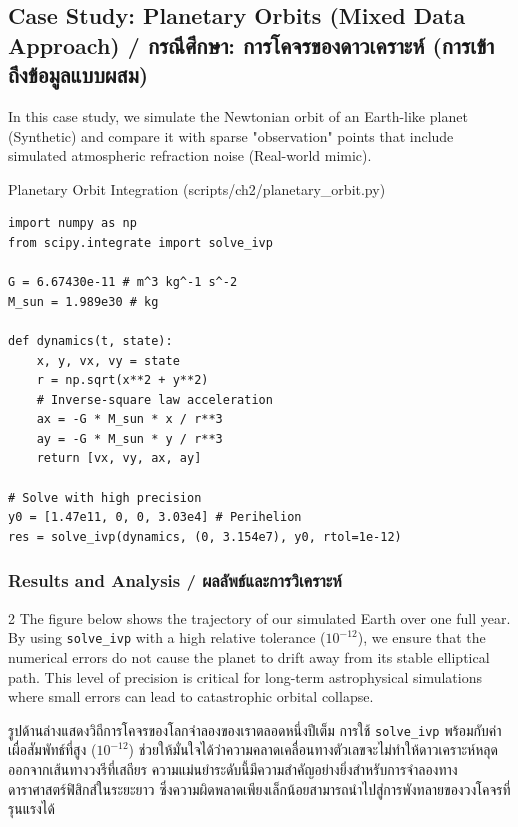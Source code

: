 \subsection{Case Study: Planetary Orbits (Mixed Data Approach) \quad / \quad \textthai{กรณีศึกษา: การโคจรของดาวเคราะห์ (การเข้าถึงข้อมูลแบบผสม)}}
In this case study, we simulate the Newtonian orbit of an Earth-like planet (Synthetic) and compare it with sparse "observation" points that include simulated atmospheric refraction noise (Real-world mimic).

\begin{pythonbox}{Planetary Orbit Integration (scripts/ch2/planetary\_orbit.py)}
\begin{lstlisting}
import numpy as np
from scipy.integrate import solve_ivp

G = 6.67430e-11 # m^3 kg^-1 s^-2
M_sun = 1.989e30 # kg

def dynamics(t, state):
    x, y, vx, vy = state
    r = np.sqrt(x**2 + y**2)
    # Inverse-square law acceleration
    ax = -G * M_sun * x / r**3
    ay = -G * M_sun * y / r**3
    return [vx, vy, ax, ay]

# Solve with high precision
y0 = [1.47e11, 0, 0, 3.03e4] # Perihelion
res = solve_ivp(dynamics, (0, 3.154e7), y0, rtol=1e-12)
\end{lstlisting}
\end{pythonbox}

\subsubsection*{Results and Analysis \quad / \quad \textthai{ผลลัพธ์และการวิเคราะห์}}
\begin{paracol}{2}
The figure below shows the trajectory of our simulated Earth over one full year. By using \texttt{solve\_ivp} with a high relative tolerance ($10^{-12}$), we ensure that the numerical errors do not cause the planet to drift away from its stable elliptical path. This level of precision is critical for long-term astrophysical simulations where small errors can lead to catastrophic orbital collapse.

\switchcolumn

\begin{thai}
รูปด้านล่างแสดงวิถีการโคจรของโลกจำลองของเราตลอดหนึ่งปีเต็ม การใช้ \texttt{solve\_ivp} พร้อมกับค่าเผื่อสัมพัทธ์ที่สูง ($10^{-12}$) ช่วยให้มั่นใจได้ว่าความคลาดเคลื่อนทางตัวเลขจะไม่ทำให้ดาวเคราะห์หลุดออกจากเส้นทางวงรีที่เสถียร ความแม่นยำระดับนี้มีความสำคัญอย่างยิ่งสำหรับการจำลองทางดาราศาสตร์ฟิสิกส์ในระยะยาว ซึ่งความผิดพลาดเพียงเล็กน้อยสามารถนำไปสู่การพังทลายของวงโคจรที่รุนแรงได้
\end{thai}
\end{paracol}

